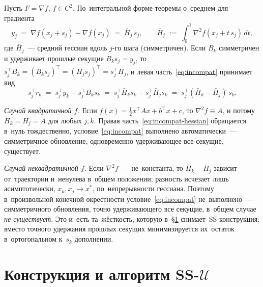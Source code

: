 \begin{remark}
Пусть $F = \nabla f$, $f\in C^2$. По~интегральной форме теоремы
о~среднем для градиента
\[
  y_j \;=\; \nabla f(x_j + s_j) - \nabla f(x_j) \;=\; \bar{H}_j\, s_j,
  \qquad
  \bar{H}_j \;:=\; \int_0^1 \nabla^2 f(x_j + t\, s_j)\, dt,
\]
где $\bar{H}_j$~--- средний гессиан вдоль $j$-го шага (симметричен).
Если $B_k$ симметричен и удерживает прошлые секущие $B_k s_j = y_j$,
то $s_j^\top B_k = (B_k s_j)^\top = (\bar{H}_j s_j)^\top = s_j^\top \bar{H}_j$,
и левая часть~\eqref{eq:incompat} принимает вид
\begin{equation}\label{eq:incompat-hessian}
  s_j^\top r_k
  \;=\; s_j^\top y_k - s_j^\top B_k s_k
  \;=\; s_j^\top \bar{H}_k s_k - s_j^\top \bar{H}_j s_k
  \;=\; s_j^\top (\bar{H}_k - \bar{H}_j)\, s_k.
\end{equation}

\emph{Случай квадратичной $f$.} Если $f(x) = \tfrac12 x^\top A x + b^\top x + c$,
то $\nabla^2 f \equiv A$, и потому $\bar{H}_k = \bar{H}_j = A$ для любых $j,k$.
Правая часть~\eqref{eq:incompat-hessian} обращается в~нуль тождественно,
условие~\eqref{eq:incompat} выполнено автоматически~--- симметричное
обновление, одновременно удерживающее все секущие, существует.

\emph{Случай неквадратичной $f$.} Если $\nabla^2 f$~--- не~константа, то
$\bar{H}_k - \bar{H}_j$ зависит от~траектории и~ненулева в~общем положении;
разность исчезает лишь асимптотически, $x_k, x_j \to x^*$, по~непрерывности
гессиана. Поэтому в~произвольной конечной окрестности
условие~\eqref{eq:incompat} не~выполнено~--- симметричного обновления,
точно удерживающего все секущие, в~общем случае \emph{не существует}.
Это и~есть та~жёсткость, которую в~\S\ref{sec:ss_construction}
снимает~SS-конструкция: вместо точного удержания прошлых секущих
минимизируется их~остаток в~ортогональном к~$s_k$ дополнении.
\end{remark}


\section{Конструкция и алгоритм SS-\texorpdfstring{$\mathcal{U}$}{U}}
\label{sec:ss_construction}

